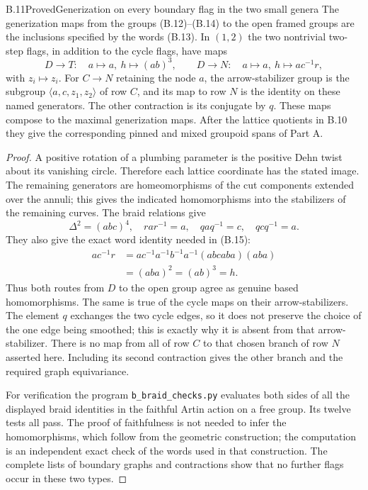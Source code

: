 \begin{result}{B.11}{Proved}{Generization on every boundary flag in the two small genera}
The generization maps from the groups (B.12)--(B.14) to the open
framed groups are the inclusions specified by the words (B.13).
In $(1,2)$ the two nontrivial two-step flags, in addition to the
cycle flags, have maps
\[
 D\longrightarrow T:\quad a\mapsto a,\ h\mapsto(ab)^3,
 \qquad
 D\longrightarrow N:\quad a\mapsto a,\ h\mapsto ac^{-1}r,
 \tag{B.15}
\]
with $z_i\mapsto z_i$.  For $C\to N$ retaining the node $a$, the
arrow-stabilizer group is the subgroup
$\langle a,c,z_1,z_2\rangle$ of row $C$, and its map to row $N$ is
the identity on these named generators.  The other contraction is
its conjugate by $q$.  These maps compose to the maximal
generization maps.  After the lattice quotients in B.10 they give
the corresponding pinned and mixed groupoid spans of Part A.
\end{result}
\begin{proof}
A positive rotation of a plumbing parameter is the positive Dehn
twist about its vanishing circle.  Therefore each lattice
coordinate has the stated image.  The remaining generators are
homeomorphisms of the cut components extended over the annuli;
this gives the indicated homomorphisms into the stabilizers of the
remaining curves.  The braid relations give
\[
 \Delta^2=(abc)^4,\quad rar^{-1}=a,\quad
 q a q^{-1}=c,\quad q c q^{-1}=a.
\]
They also give the exact word identity needed in (B.15):
\[
 \begin{split}
 ac^{-1}r
 &=ac^{-1}a^{-1}b^{-1}a^{-1}(abcaba)(aba)\\
 &=(aba)^2=(ab)^3=h.
 \end{split}
\]
Thus both routes from $D$ to the open group agree as genuine based
homomorphisms.  The same is true of the cycle maps on their
arrow-stabilizers.  The element $q$ exchanges the two cycle edges,
so it does not preserve the choice of the one edge being smoothed;
this is exactly why it is absent from that arrow-stabilizer.  There
is no map from all of row $C$ to that chosen branch of row $N$
asserted here.  Including its second contraction gives the other
branch and the required graph equivariance.

For verification the program \texttt{b\_braid\_checks.py} evaluates
both sides of all the displayed braid identities in the faithful
Artin action on a free group.  Its twelve tests all pass.  The
proof of faithfulness is not needed to infer the homomorphisms,
which follow from the geometric construction; the computation is
an independent exact check of the words used in that construction.
The complete lists of boundary graphs and contractions show that
no further flags occur in these two types.
\end{proof}

